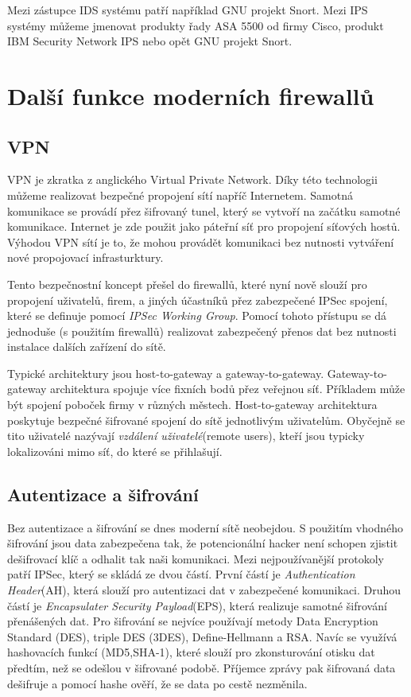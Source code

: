 \documentclass[11pt,a4paper]{article}
\begin{document}
Mezi zástupce IDS systému patří například GNU projekt Snort. Mezi IPS systémy můžeme jmenovat produkty řady ASA 5500 od firmy Cisco, produkt IBM Security Network IPS nebo opět GNU projekt Snort. 

\section{Další funkce moderních firewallů}
\subsection{VPN}
VPN je zkratka z anglického Virtual Private Network. Díky této technologii můžeme realizovat bezpečné propojení sítí napříč Internetem. Samotná komunikace se provádí přez šifrovaný tunel, který se vytvoří na začátku samotné komunikace. Internet je zde použit jako páteřní síť pro propojení síťových hostů. Výhodou VPN sítí je to, že mohou provádět komunikaci bez nutnosti vytváření nové propojovací infrasturktury.

Tento bezpečnostní koncept přešel do firewallů, které nyní nově slouží pro propojení uživatelů, firem, a jiných účastníků přez zabezpečené IPSec spojení, které se definuje pomocí \textit{IPSec Working Group}. Pomocí tohoto přístupu se dá jednoduše (s použitím firewallů) realizovat zabezpečený přenos dat bez nutnosti instalace dalších zařízení do sítě.

Typické architektury jsou host-to-gateway a gateway-to-gateway. Gateway-to-gateway architektura spojuje více fixních bodů přez veřejnou síť. Příkladem může být spojení poboček firmy v různých městech. Host-to-gateway architektura poskytuje bezpečné šifrované spojení do sítě jednotlivým uživatelům. Obyčejně se tito uživatelé nazývají \textit{vzdálení uživatelé}(remote users), kteří jsou typicky lokalizováni mimo síť, do které se přihlašují.

\subsection{Autentizace a šifrování}
Bez autentizace a šifrování se dnes moderní sítě neobejdou. S použitím vhodného šifrování jsou data zabezpečena tak, že potencionální hacker není schopen zjistit dešifrovací klíč a odhalit tak naši komunikaci. Mezi nejpoužívanější protokoly patří IPSec, který se skládá ze dvou částí. První částí je \textit{Authentication Header}(AH), která slouží pro autentizaci dat v zabezpečené komunikaci. Druhou částí je \textit{Encapsulater Security Payload}(EPS), která realizuje samotné šifrování přenášených dat. Pro šifrování se nejvíce používají metody Data Encryption Standard (DES), triple DES (3DES), Define-Hellmann a RSA. Navíc se využívá hashovacích funkcí (MD5,SHA-1), které slouží pro zkonsturování otisku dat předtím, než se odešlou v šifrované podobě. Příjemce zprávy pak šifrovaná data dešifruje a pomocí hashe ověří, že se data po cestě nezměnila.
\end{document}
